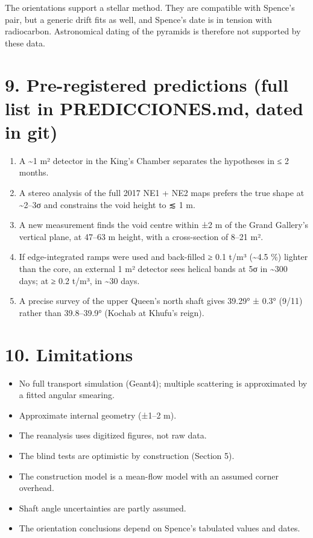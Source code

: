 \documentclass[
]{article}
\providecommand{\tightlist}{%
  \setlength{\itemsep}{0pt}\setlength{\parskip}{0pt}}
\begin{document}
The orientations support a stellar method. They are compatible with
Spence's pair, but a generic drift fits as well, and Spence's date is in
tension with radiocarbon. Astronomical dating of the pyramids is
therefore not supported by these data.

\hypertarget{pre-registered-predictions-full-list-in-predicciones.md-dated-in-git}{%
\section{9. Pre-registered predictions (full list in PREDICCIONES.md,
dated in
git)}\label{pre-registered-predictions-full-list-in-predicciones.md-dated-in-git}}

\begin{enumerate}
\def\labelenumi{\arabic{enumi}.}
\tightlist
\item
  A \textasciitilde1 m² detector in the King's Chamber separates the
  hypotheses in ≤ 2 months.
\item
  A stereo analysis of the full 2017 NE1 + NE2 maps prefers the true
  shape at \textasciitilde2--3σ and constrains the void height to ≲ 1 m.
\item
  A new measurement finds the void centre within ±2 m of the Grand
  Gallery's vertical plane, at 47--63 m height, with a cross-section of
  8--21 m².
\item
  If edge-integrated ramps were used and back-filled ≥ 0.1 t/m³
  (\textasciitilde4.5 \%) lighter than the core, an external 1 m²
  detector sees helical bands at 5σ in \textasciitilde300 days; at ≥ 0.2
  t/m³, in \textasciitilde30 days.
\item
  A precise survey of the upper Queen's north shaft gives 39.29° ± 0.3°
  (9/11) rather than 39.8--39.9° (Kochab at Khufu's reign).
\end{enumerate}

\hypertarget{limitations}{%
\section{10. Limitations}\label{limitations}}

\begin{itemize}
\tightlist
\item
  No full transport simulation (Geant4); multiple scattering is
  approximated by a fitted angular smearing.
\item
  Approximate internal geometry (±1--2 m).
\item
  The reanalysis uses digitized figures, not raw data.
\item
  The blind tests are optimistic by construction (Section 5).
\item
  The construction model is a mean-flow model with an assumed corner
  overhead.
\item
  Shaft angle uncertainties are partly assumed.
\item
  The orientation conclusions depend on Spence's tabulated values and
  dates.
\end{itemize}
\end{document}
